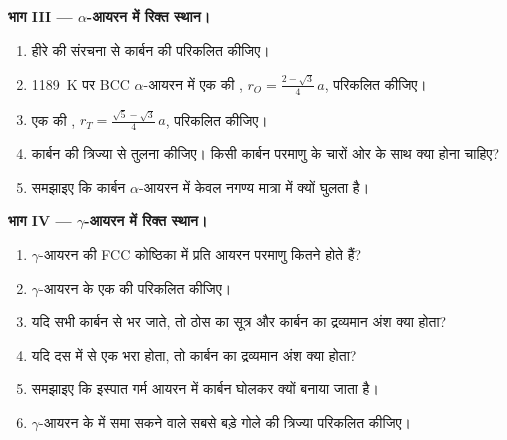 \begin{problem}
\medskip
\noindent\textbf{भाग III --- $\alpha$-आयरन में रिक्त स्थान।}
\begin{enumerate}[resume]
  \item हीरे की संरचना से कार्बन की  परिकलित कीजिए।
  \item \qty{1189}{K} पर BCC $\alpha$-आयरन में एक  की ,
        $r_O = \frac{2 - \sqrt3}{4}\,a$, परिकलित कीजिए।
  \item एक  की , $r_T = \frac{\sqrt5 -
        \sqrt3}{4}\,a$, परिकलित कीजिए।
  \item कार्बन की त्रिज्या से तुलना कीजिए। किसी कार्बन परमाणु के चारों ओर
         के साथ क्या होना चाहिए?
  \item समझाइए कि कार्बन $\alpha$-आयरन में केवल नगण्य मात्रा में
        क्यों घुलता है।
\end{enumerate}

\medskip
\noindent\textbf{भाग IV --- $\gamma$-आयरन में रिक्त स्थान।}
\begin{enumerate}[resume]
  \item $\gamma$-आयरन की FCC कोष्ठिका में प्रति आयरन परमाणु कितने 
        होते हैं?
  \item $\gamma$-आयरन के एक  की  परिकलित कीजिए।
  \item यदि सभी  कार्बन से भर जाते, तो ठोस का सूत्र
        और कार्बन का द्रव्यमान अंश क्या होता?
  \item यदि दस में से एक  भरा होता, तो कार्बन का द्रव्यमान
        अंश क्या होता?
  \item समझाइए कि इस्पात गर्म आयरन में कार्बन घोलकर क्यों बनाया जाता है।
  \item $\gamma$-आयरन के  में समा सकने वाले सबसे बड़े गोले की
        त्रिज्या परिकलित कीजिए।
\end{enumerate}
\end{problem}
